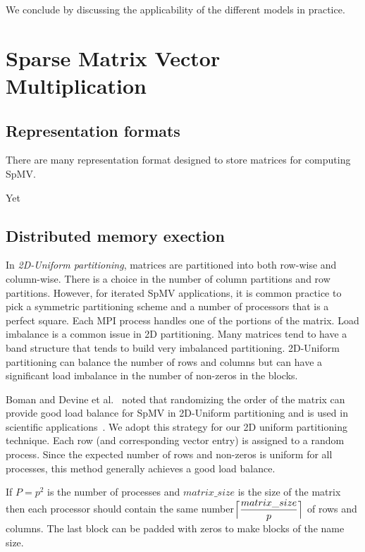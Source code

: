 \documentclass[conference, 10ppt]{IEEEtran}
\begin{document}
We conclude by discussing the applicability of the different models in
practice.

\section{Sparse Matrix Vector Multiplication}

\subsection{Representation formats}

There are many representation format designed to store matrices for
computing SpMV.

Yet

\subsection{Distributed memory exection}

In \textit{2D-Uniform partitioning},  matrices
are partitioned into both row-wise and column-wise.  There is a choice
in the number of column partitions and row partitions. However, for
iterated SpMV applications, it is common practice to pick a symmetric
partitioning scheme and a number of processors that is a perfect
square. Each MPI process handles one of the portions of the matrix.
Load imbalance is a common issue in 2D partitioning. Many matrices
tend to have a band structure that tends to build very imbalanced
partitioning.  2D-Uniform partitioning can balance the number of rows
and columns but can have a significant load imbalance in the number
of non-zeros in the blocks.

Boman and Devine et al.~\cite{boman2013scalable} noted that
randomizing the order of the matrix can provide good load balance for
SpMV in 2D-Uniform partitioning and is used in scientific
applications~\cite{dytrych2016efficacy}. We adopt this strategy for
our 2D uniform partitioning technique. Each row (and corresponding
vector entry) is assigned to a random process.  Since the expected
number of rows and non-zeros is uniform for all processes, this method
generally achieves a good load balance.

If $P=p^2$ is the number of processes
and $matrix\_size$ is the size of the matrix then each processor
should contain the same
number$\Bigl\lceil\dfrac{matrix\_size}{p}\Bigr\rceil$ of rows and
columns. The last block can be padded with zeros to make blocks of the name size.
\end{document}

